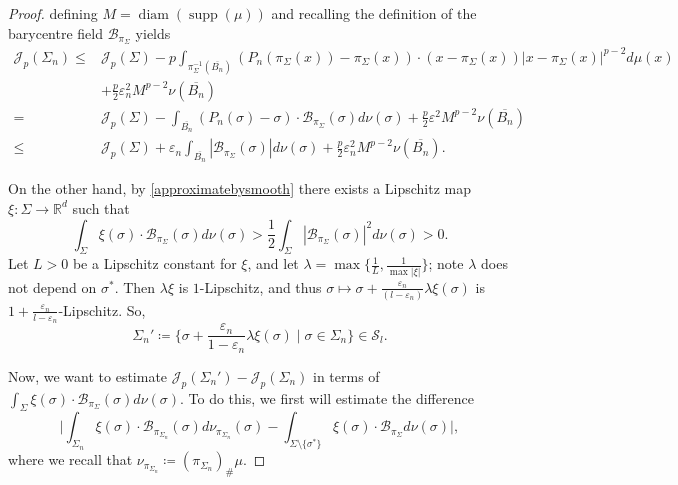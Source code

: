\documentclass[preprint, reqno]{amsart}
\DeclareMathOperator*{\supp}{supp}
\DeclareMathOperator*{\diam}{diam}
\renewcommand{\epsilon}{\varepsilon}
\theoremstyle{definition}
\numberwithin{equation}{section}
\begin{document}
\begin{proof}
  defining $M = \diam(\supp(\mu))$ and recalling the definition of the
  barycentre field $\mathcal{B}_{\pi_{\Sigma}}$ yields
  \begin{align}\label{eq:Sigma-n-Sigma} \nonumber
    \mathscr{J}_p(\Sigma_{n}) \leq
    & \mathscr{J}_p(\Sigma) - p\int_{\pi_{\Sigma}^{-1}(
      \overline{B_n})}(P_{n}(\pi_{\Sigma}(x)) - \pi_{\Sigma}(x))\cdot
      (x - \pi_{\Sigma}(x))|x - \pi_{\Sigma}(x)|^{p-2} d\mu(x) \\
    \nonumber
    &+ \frac{p}{2} \epsilon_n^2 M^{p-2} \nu(\overline{B_n}) \\
    \nonumber
    =& \mathscr{J}_p(\Sigma) - \int_{ \overline{B_n}}(P_{n}(\sigma) -
       \sigma)\cdot \mathcal{B}_{\pi_{\Sigma}}(\sigma) d\nu(\sigma) +
       \frac{p}{2} \epsilon^2 M^{p-2}\nu(\overline{B_n}) \\
    \leq
    & \mathscr{J}_p(\Sigma) + \epsilon_n
      \int_{\overline{B_n}}|\mathcal{B}_{\pi_{\Sigma}}(\sigma)|
      d\nu(\sigma) +\frac{p}{2} \epsilon_n^2
      M^{p-2}\nu(\overline{B_n}).
  \end{align}

  On the other hand, by \cref{approximatebysmooth} there exists a
  Lipschitz map $\xi: \Sigma \to \mathbb{R}^d$ such that
  \begin{equation}
    \int_{\Sigma}\xi(\sigma)\cdot
    \mathcal{B}_{\pi_{\Sigma}}(\sigma)d\nu(\sigma) >
    \frac{1}{2}\int_{\Sigma}|\mathcal{B}_{\pi_{\Sigma}}(\sigma)|^2
    d\nu(\sigma) > 0. \label{eq:applying-lem-2-11}
  \end{equation}
  Let $L >0$ be a Lipschitz constant for $\xi$, and let $\lambda =
  \max\{\frac{1}{L}, \frac{1}{\max |\xi|}\}$; note $\lambda$ does not
  depend on $\sigma^*$. Then $\lambda \xi$ is $1$-Lipschitz, and thus
  $\sigma \mapsto \sigma + \frac{\epsilon_n}{(l - \epsilon_n)}\lambda
  \xi(\sigma)$ is $1 + \frac{\epsilon_n}{l - \epsilon_n}$-Lipschitz.
  So,
  \[
    \Sigma_n' \coloneqq \{\sigma + \frac{\epsilon_n}{1 -
      \epsilon_n}\lambda \xi(\sigma) \mid \sigma \in \Sigma_{n}\} \in
    \mathcal{S}_l.
  \]

  Now, we want to estimate $\mathscr{J}_p(\Sigma_n') -
  \mathscr{J}_p(\Sigma_n)$ in terms of $\int_{\Sigma}\xi(\sigma)\cdot
  \mathcal{B}_{\pi_{\Sigma}}(\sigma)d\nu(\sigma)$. To do this, we
  first will estimate the difference
  \[
    \bigg|\int_{\Sigma_n} \xi(\sigma)\cdot
    \mathcal{B}_{\pi_{\Sigma_n}}(\sigma)d\nu_{\pi_{\Sigma_n}}(\sigma)
    - \int_{\Sigma \setminus \{\sigma^*\}}\xi(\sigma)\cdot
    \mathcal{B}_{\pi_{\Sigma}}d\nu(\sigma)\bigg|,
  \]
  where we recall that $\nu_{\pi_{\Sigma_n}} \coloneqq
  (\pi_{\Sigma_n})_{\#}\mu$.


\end{proof}
\end{document}

